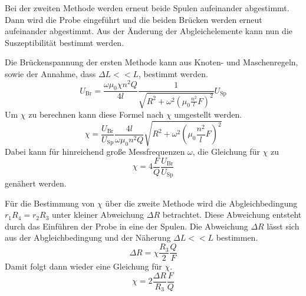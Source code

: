 Bei der zweiten Methode werden erneut beide Spulen aufeinander abgestimmt. Dann wird die Probe eingeführt und die beiden Brücken werden erneut aufeinander abgestimmt. Aus der
Änderung der Abgleichelemente kann nun die Suszeptibilität bestimmt werden.

Die Brückenspannung der ersten Methode kann aus Knoten- und Maschenregeln, sowie der Annahme, dass $\Delta L << L$, bestimmt werden. 
\begin{equation*}
    U_{\text{Br}} = \frac{\omega\mu_0\chi n^2Q}{4l}\frac{1}{\sqrt{R^2 + \omega^2\left(\mu_0\frac{n^2}{l}F\right)^2}}U_{\text{Sp}}
\end{equation*}
Um $\chi$ zu berechnen kann diese Formel nach $\chi$ umgestellt werden.
\begin{equation}
    \label{eqn:chi_theo}
    \chi = \frac{U_{\text{Br}}}{U_{\text{Sp}}}\frac{4l}{\omega\mu_0n^2Q}\sqrt{R^2 + \omega^2\left(\mu_0\frac{n^2}{l}F\right)^2}
\end{equation}
Dabei kann für hinreichend große Messfrequenzen $\omega$, die Gleichung für $\chi$ zu
\begin{equation}
    \label{eqn:chi:näherung}
    \chi = 4 \frac{F}{Q}\frac{U_{\text{Br}}}{U_{\text{Sp}}}
\end{equation}
genähert werden.

Für die Bestimmung von $\chi$ über die zweite Methode wird die Abgleichbedingung $r_1R_4 = r_2R_3$ unter kleiner Abweichung $\Delta R$ betrachtet. Diese Abweichung entsteht
durch das Einführen der Probe in eine der Spulen. Die Abweichung $\Delta R$ lässt sich aus der Abgleichbedingung und der Näherung $\Delta L << L$ bestimmen.
\begin{equation*}
    \Delta R = \chi\frac{R_3}{2}\frac{Q}{F}
\end{equation*}
Damit folgt dann wieder eine Gleichung für $\chi$.
\begin{equation}
    \label{eqn:chimethode2}
    \chi = 2\frac{\Delta R}{R_3}\frac{F}{Q}
\end{equation}

